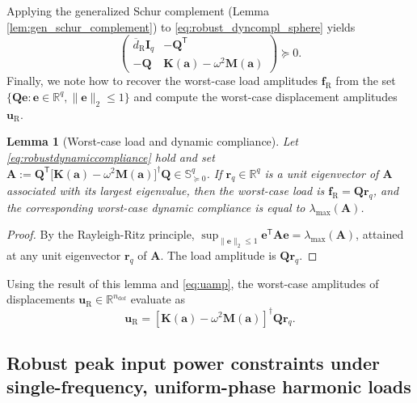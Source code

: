 \documentclass[preprint,3p]{elsarticle}
\newtheorem{lemma}{Lemma}
\newcommand{\T}{^{\mathsf T}}
\newcommand{\ndof}{n_\mathrm{dof}}
\newcommand{\R}{\mathrm{R}}
\numberwithin{equation}{section}
\begin{document}
Applying the generalized Schur complement (Lemma \ref{lem:gen_schur_complement}) to \eqref{eq:robust_dyncompl_sphere} yields
%
\begin{equation}\label{eq:robustdynamiccompliance}
  \begin{pmatrix}
    \overline{d}_\R\mathbf{I}_q & -\mathbf{Q}\T\\
    -\mathbf{Q}  & \mathbf{K}(\mathbf{a}) - \omega^2 \mathbf{M}(\mathbf{a})
  \end{pmatrix}\succeq 0.
\end{equation}
%
Finally, we note how to recover the worst-case load amplitudes $\mathbf{f}_\R$ from the set $\{\mathbf{Q}\mathbf{e}: \mathbf{e} \in \mathbb{R}^{q}, \lVert\mathbf{e}\rVert_2 \le 1\}$ and compute the worst-case displacement amplitudes $\mathbf{u}_\R$.

\begin{lemma}[Worst-case load and dynamic compliance]\label{lemma:worstload}
Let \eqref{eq:robustdynamiccompliance} hold and set $\mathbf{A}:=\mathbf{Q}\T\big[\mathbf{K}(\mathbf{a})-\omega^2\mathbf{M}(\mathbf{a})\big]^\dagger\mathbf{Q}\in\mathbb{S}^q_{\succeq 0}$. If $\mathbf{r}_q\in\mathbb{R}^q$ is a unit eigenvector of $\mathbf{A}$ associated with its largest eigenvalue, then the worst-case load is $\mathbf{f}_\R=\mathbf{Q}\mathbf{r}_q$, and the corresponding worst-case dynamic compliance is equal to $\lambda_{\max}(\mathbf{A})$.
\end{lemma}
\begin{proof}
By the Rayleigh-Ritz principle, $\sup_{\lVert\mathbf{e}\rVert_2\le 1}\mathbf{e}\T \mathbf{A}\mathbf{e}=\lambda_{\max}(\mathbf{A})$, attained at any unit eigenvector $\mathbf{r}_q$ of $\mathbf{A}$. The load amplitude is $\mathbf{Q}\mathbf{r}_q$.
\end{proof}

Using the result of this lemma and \eqref{eq:uamp}, the worst-case amplitudes of displacements $\mathbf{u}_\R \in \mathbb{R}^{\ndof}$ evaluate as
%
\begin{equation}
  \mathbf{u}_\R = \left[ \mathbf{K}(\mathbf{a}) - \omega^2 \mathbf{M}(\mathbf{a})\right]^\dagger \mathbf{Q} \mathbf{r}_{q}.
\end{equation}

\subsection{Robust peak input power constraints under single-frequency, uniform-phase harmonic loads}\label{sec:peakpower}
\end{document}
